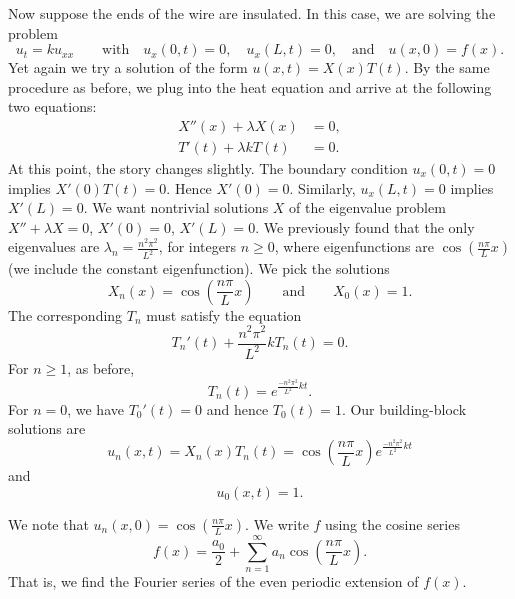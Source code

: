Now suppose the ends of the wire are insulated.
In this case, we are solving
the problem
\begin{equation*}
u_t = k u_{xx}
\qquad \text{with} \quad
u_x(0,t) = 0, \quad u_x(L,t) = 0,
\quad \text{and} \quad u(x,0) = f(x) .
\end{equation*}
Yet again we try a solution of the form $u(x,t) = X(x)T(t)$.  By the same
procedure as before, we plug into the heat equation and arrive at the
following
two equations:
\begin{align*}
X''(x) + \lambda X(x) &= 0 , \\
T'(t) + \lambda k T(t) &= 0 .
\end{align*}
At this point, the story changes slightly.
The boundary condition $u_x(0,t) = 0$ implies $X'(0)T(t) = 0$.
Hence $X'(0) = 0$.  Similarly, $u_x(L,t) = 0$ implies $X'(L) = 0$.
We want nontrivial solutions $X$ of the eigenvalue problem
$X'' + \lambda X = 0$, $X'(0) = 0$, $X'(L) = 0$.  We previously found that
the only eigenvalues are $\lambda_n = \frac{n^2 \pi^2}{L^2}$, for integers
$n \geq 0$,
where eigenfunctions are $\cos \left( \frac{n \pi}{L} x\right)$
(we include the constant
eigenfunction).  We pick
the solutions
\begin{equation*}
X_n (x) = \cos \left( \frac{n \pi}{L} x \right)
\qquad \text{and} \qquad
X_0 (x) = 1.
\end{equation*}
The corresponding $T_n$ must satisfy the equation
\begin{equation*}
T_n'(t) + \frac{n^2 \pi^2}{L^2} k T_n(t) = 0 .
\end{equation*}
For $n \geq 1$, as before,
\begin{equation*}
T_n(t) = e^{\frac{-n^2 \pi^2}{L^2} k t} .
\end{equation*}
For $n = 0$, we have $T_0'(t) = 0$ and hence $T_0(t) = 1$.
Our building-block solutions are
\begin{equation*}
u_n(x,t) = X_n(x)T_n(t) =
\cos \left( \frac{n \pi}{L} x \right)
e^{\frac{-n^2 \pi^2}{L^2} k t}
\end{equation*}
and
\begin{equation*}
u_0(x,t) = 1 .
\end{equation*}

We note that $u_n(x,0) = \cos \left( \frac{n \pi}{L} x \right)$.
We write $f$ using the cosine series
\begin{equation*}
f(x) = \frac{a_0}{2} + \sum_{n=1}^\infty a_n \cos \left( \frac{n \pi}{L} x
\right) .
\end{equation*}
That is, we find the Fourier series of the even periodic extension of $f(x)$.

